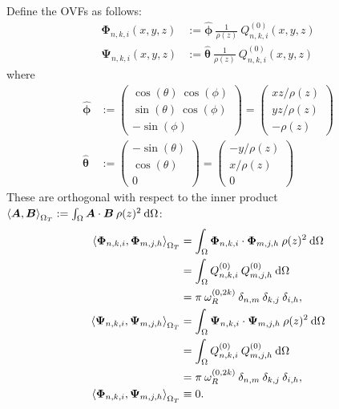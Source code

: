 \documentclass[11pt, oneside]{article}   	%
\newcommand{\genjac}{R}
\newcommand{\normgenjac}{\omega_\genjac}
\newcommand{\scop}{Q}
\newcommand{\scopnki}{\scop_{n,k,i}}
\newcommand{\scopmjh}{\scop_{m,j,h}}
\newcommand{\tangentspace}{{\Omega_T}}
\newcommand{\phivec}{\hat{\bm{\phi}}}
\newcommand{\thetavec}{\hat{\bm{\theta}}}
\newcommand{\tsopi}{\bm{\Phi}}
\newcommand{\tsopii}{\bm{\Psi}}
\newcommand{\tsopinki}{\tsopi_{n,k,i}}
\newcommand{\tsopiinki}{\tsopii_{n,k,i}}
\begin{document}
Define the OVFs as follows:
\begin{align}
	\tsopinki(x,y,z) &:= \phivec \: \frac{1}{\rho(z)} \: \scopnki^{(0)}(x,y,z) \\
	\tsopiinki(x,y,z) &:= \thetavec \: \frac{1}{\rho(z)} \: \scopnki^{(0)}(x,y,z)
\end{align}
where
\begin{align}
	\phivec &:= 
		\begin{pmatrix}
			\cos(\theta) \: \cos(\phi) \\
			\sin(\theta) \: \cos(\phi) \\
			- \sin(\phi)
		\end{pmatrix}
		=
		\begin{pmatrix}
			x z / \rho(z) \\
			y z / \rho(z) \\
			- \rho(z)
		\end{pmatrix} \\
	\thetavec &:= 
		\begin{pmatrix}
			-\sin(\theta) \\
			\cos(\theta) \\
			0
		\end{pmatrix}
		=
		\begin{pmatrix}
			-y / \rho(z) \\
			x / \rho(z) \\
			0
		\end{pmatrix}
\end{align}
These are orthogonal with respect to the inner product $\ip<\bm{A}, \bm{B}>_\tangentspace := \int_\Omega \bm{A} \cdot \bm{B} \: \rho(z)^2 \:\D \Omega$:
\begin{align*}
	\ip<\tsopinki, \tsopi_{m,j,h}>_\tangentspace &= \int_\Omega \tsopinki \cdot \tsopi_{m,j,h} \: \rho(z)^2 \:\D \Omega \\
	&= \int_\Omega \scopnki^{(0)} \: \scopmjh^{(0)} \: \D \Omega \\
	&= \pi \: \normgenjac^{(0, 2k)} \: \delta_{n,m} \: \delta_{k,j} \: \delta_{i,h}, \\
	\ip<\tsopiinki, \tsopii_{m,j,h}>_\tangentspace &= \int_\Omega \tsopiinki \cdot \tsopii_{m,j,h} \: \rho(z)^2 \:\D \Omega \\
	&= \int_\Omega \scopnki^{(0)} \: \scopmjh^{(0)} \: \D \Omega \\
	&= \pi \: \normgenjac^{(0, 2k)} \: \delta_{n,m} \: \delta_{k,j} \: \delta_{i,h}, \\
	\ip<\tsopinki, \tsopii_{m,j,h}>_\tangentspace &\equiv 0.
\end{align*}
\end{document}
